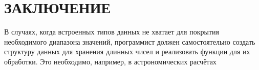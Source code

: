 \part*{ЗАКЛЮЧЕНИЕ}
В случаях, когда встроенных типов данных не хватает для покрытия необходимого диапазона значений, программист должен самостоятельно создать структуру данных для хранения длинных чисел и реализовать функции для их обработки. Это необходимо, например, в астрономических расчётах 